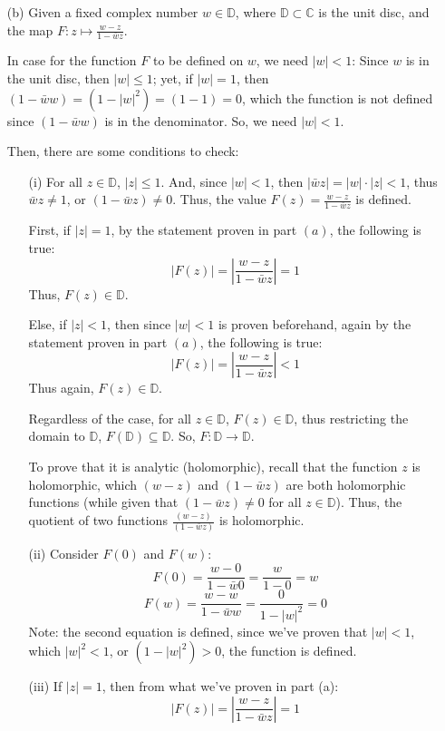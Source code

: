 \documentclass{article}
\begin{document}
\begin{itemize}
    \item[(b)]
    Given a fixed complex number $w\in \mathbb{D}$, where $\mathbb{D} \subset \mathbb{C}$ is the unit disc, and the map $F:z\mapsto\frac{w-z}{1-\bar{w}z}$. 

    In case for the function $F$ to be defined on $w$, we need $|w| <1$: Since $w$ is in the unit disc, then $|w| \leq 1$; yet, if $|w|=1$, then $(1-\bar{w}w) = (1-|w|^2) = (1-1) = 0$, which the function is not defined since $(1-\bar{w}w)$ is in the denominator. So, we need $|w| <1$.
    
    Then, there are some conditions to check:
    \begin{itemize}
        \item[(i)] For all $z\in\mathbb{D}$, $|z| \leq 1$. And, since $|w|<1$, then $|\bar{w}z|=|w|\cdot|z| < 1$, thus $\bar{w}z \neq 1$, or $(1-\bar{w}z)\neq 0$. Thus, the value $F(z)=\frac{w-z}{1-\bar{w}z}$ is defined.
        
        First, if $|z|=1$, by the statement proven in part $(a)$, the following is true:
        $$|F(z)|=\left|\frac{w-z}{1-\bar{w}z}\right|=1$$
        Thus, $F(z)\in\mathbb{D}$.

        Else, if $|z|<1$, then since $|w|<1$ is proven beforehand, again by the statement proven in part $(a)$, the following is true:
        $$|F(z)|=\left|\frac{w-z}{1-\bar{w}z}\right|<1$$
        Thus again, $F(z)\in\mathbb{D}$.

        Regardless of the case, for all $z\in\mathbb{D}$, $F(z)\in\mathbb{D}$, thus restricting the domain to $\mathbb{D}$, $F(\mathbb{D}) \subseteq \mathbb{D}$. So, $F:\mathbb{D}\rightarrow \mathbb{D}$.

        To prove that it is analytic (holomorphic), recall that the function $z$ is holomorphic, which $(w-z)$ and $(1-\bar{w}z)$ are both holomorphic functions (while given that $(1-\bar{w}z)\neq 0$ for all $z\in\mathbb{D}$). Thus, the quotient of two functions $\frac{(w-z)}{(1-\bar{w}z)}$ is holomorphic.

        \hfill

        \item[(ii)] Consider $F(0)$ and $F(w)$:
        $$F(0) = \frac{w-0}{1-\bar{w}0} = \frac{w}{1-0} = w$$
        $$F(w) = \frac{w-w}{1-\bar{w}w}=\frac{0}{1-|w|^2}=0$$
        Note: the second equation is defined, since we've proven that $|w|<1$, which $|w|^2<1$, or $(1-|w|^2)>0$, the function is defined.

        \hfill

        \item[(iii)] If $|z| = 1$, then from what we've proven in part (a):
        $$|F(z)| = \left|\frac{w-z}{1-\bar{w}z}\right| = 1$$


\end{itemize}
\end{itemize}
\end{document}
